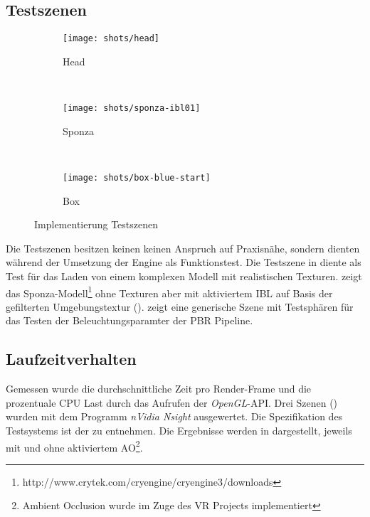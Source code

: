 \subsection{Testszenen}\label{sec:testszenen-impl}

\begin{figure}
\begin{subfigure}{\textwidth}
	\centering
	\texttt{[image: shots/head]}
	\caption{Head}\label{fig:impl-scenes-head}
\end{subfigure}\\
\begin{subfigure}{\textwidth}
	\centering
	\texttt{[image: shots/sponza-ibl01]}
	\caption{Sponza}\label{fig:impl-scenes-sponza}
\end{subfigure}\\
\begin{subfigure}{\textwidth}
	\centering
	\texttt{[image: shots/box-blue-start]}
	\caption{Box}\label{fig:impl-scenes-box}
\end{subfigure}
\caption{Implementierung Testszenen}\label{fig:impl-scenes}
\end{figure}


Die Testszenen besitzen keinen keinen Anspruch auf Praxisnähe, sondern dienten während der Umsetzung der Engine als Funktionstest. Die Testszene in  diente als Test für das Laden von einem komplexen Modell mit realistischen Texturen.  zeigt das Sponza-Modell\footnote{http://www.crytek.com/cryengine/cryengine3/downloads} ohne Texturen aber mit aktiviertem \ac{IBL} auf Basis der gefilterten Umgebungstextur ().  zeigt eine generische Szene mit Testsphären für das Testen der Beleuchtungsparamter der \ac{PBR} Pipeline.

\subsection{Laufzeitverhalten}\label{sec:laufzeit-impl}

Gemessen wurde die durchschnittliche Zeit pro Render-Frame und die prozentuale CPU Last durch das Aufrufen der \textit{OpenGL}-\ac{API}. Drei Szenen () wurden mit dem Programm \textit{nVidia Nsight} ausgewertet. Die Spezifikation des Testsystems ist der  zu entnehmen. Die Ergebnisse werden in  dargestellt, jeweils mit und ohne aktiviertem \ac{AO}\footnote{Ambient Occlusion wurde im Zuge des VR Projects implementiert}.


